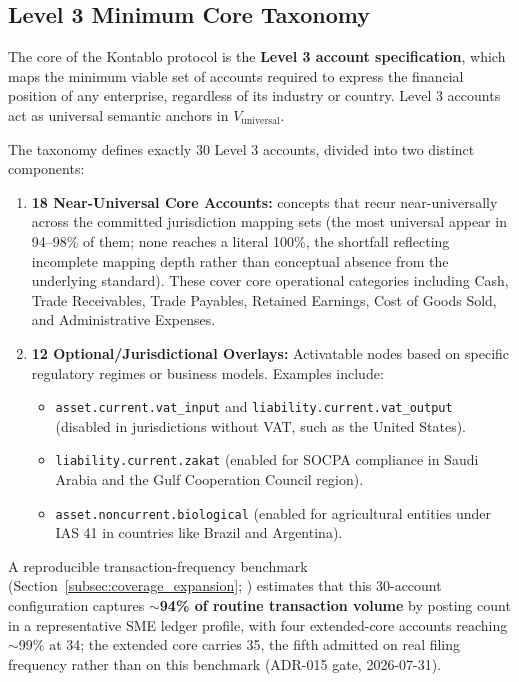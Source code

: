 



\subsection{Level 3 Minimum Core Taxonomy}
The core of the Kontablo protocol is the \textbf{Level 3 account specification}, which maps the minimum viable set of accounts required to express the financial position of any enterprise, regardless of its industry or country. Level 3 accounts act as universal semantic anchors in $V_{\text{universal}}$. 

The taxonomy defines exactly 30 Level 3 accounts, divided into two distinct components:
\begin{enumerate}
    \item \textbf{18 Near-Universal Core Accounts:} concepts that recur near-universally across the committed jurisdiction mapping sets (the most universal appear in 94--98\% of them; none reaches a literal 100\%, the shortfall reflecting incomplete mapping depth rather than conceptual absence from the underlying standard). These cover core operational categories including Cash, Trade Receivables, Trade Payables, Retained Earnings, Cost of Goods Sold, and Administrative Expenses.
    \item \textbf{12 Optional/Jurisdictional Overlays:} Activatable nodes based on specific regulatory regimes or business models. Examples include:
    \begin{itemize}
        \item \texttt{asset.current.vat\_input} and \texttt{liability.current.vat\_output} (disabled in jurisdictions without VAT, such as the United States).
        \item \texttt{liability.current.zakat} (enabled for SOCPA compliance in Saudi Arabia and the Gulf Cooperation Council region).
        \item \texttt{asset.noncurrent.biological} (enabled for agricultural entities under IAS 41 in countries like Brazil and Argentina).
    \end{itemize}
\end{enumerate}
A reproducible transaction-frequency benchmark (Section~\ref{subsec:coverage_expansion}; ) estimates that this 30-account configuration captures $\sim$\textbf{94\% of routine transaction volume} by posting count in a representative SME ledger profile, with four extended-core accounts reaching $\sim$99\% at 34; the extended core carries 35, the fifth admitted on real filing frequency rather than on this benchmark (ADR-015 gate, 2026-07-31).

